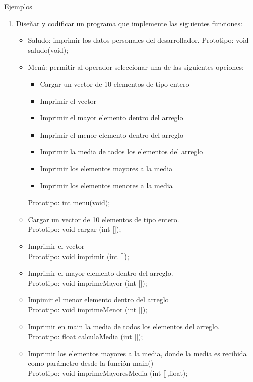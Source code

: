 \documentclass[xcolor=pdftex,table,11pt]{beamer}
\begin{document}
\begin{frame}[allowframebreaks]{Ejemplos}
 \begin{enumerate}
   
     \item Diseñar y codificar un programa que implemente las siguientes funciones:
     \begin{itemize}
     \item Saludo: imprimir los datos personales del desarrollador. Prototipo: void saludo(void);
     \item Menú: permitir al operador seleccionar una de las siguientes opciones:
     \begin{itemize}
     \item Cargar un vector de 10 elementos de tipo entero
     \item Imprimir el vector
     \item Imprimir el mayor elemento dentro del arreglo
     \item Imprimir el menor elemento dentro del arreglo
     \item Imprimir la media de todos los elementos del arreglo
	 \item Imprimir los elementos mayores a la media
	 \item Imprimir los elementos menores a la media
     \end{itemize}
     Prototipo: int menu(void);
   
     \item Cargar un vector de 10 elementos de tipo entero.\\
      		Prototipo: void cargar (int []);
	\item Imprimir el vector\\
     Prototipo: void imprimir (int []);

    \item Imprimir el mayor elemento dentro del arreglo. \\
     	     Prototipo: void imprimeMayor (int []);
     	     
      \item Impimir el menor elemento dentro del arreglo\\
     	     Prototipo: void imprimeMenor (int []);
	 
	    \item Imprimir en main la media de todos los elementos del arreglo.\\
    	Prototipo: float calculaMedia (int []);
    	
	 \item Imprimir los elementos mayores a la media, donde la media es recibida como parámetro desde la función main()\\
	  Prototipo: void imprimeMayoresMedia (int [],float);
	  

\end{itemize}
\end{enumerate}
\end{frame}
\end{document}
